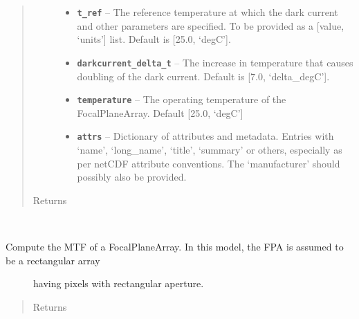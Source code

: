 \documentclass[a4paper,10pt,english]{sphinxmanual}
\begin{document}
\begin{fulllineitems}
\begin{fulllineitems}
\begin{quote}
\begin{description}
\begin{itemize}
\item {} 
\textbf{\texttt{t\_ref}} -- The reference temperature at which the dark current and other parameters are specified.
To be provided as a {[}value, `units'{]} list. Default is {[}25.0, `degC'{]}.

\item {} 
\textbf{\texttt{darkcurrent\_delta\_t}} -- The increase in temperature that causes doubling of the dark current.
Default is {[}7.0, `delta\_degC'{]}.

\item {} 
\textbf{\texttt{temperature}} -- The operating temperature of the FocalPlaneArray. Default {[}25.0, `degC'{]}

\item {} 
\textbf{\texttt{attrs}} -- Dictionary of attributes and metadata. Entries with `name', `long\_name', `title',
`summary' or others, especially as per netCDF attribute conventions.
The `manufacturer' should possibly also be provided.

\end{itemize}

\item[{Returns}] \leavevmode


\end{description}\end{quote}

\end{fulllineitems}


\begin{fulllineitems}
\label{packages:electro.FocalPlaneArray.compute_mtf}~\begin{description}
\item[{Compute the MTF of a FocalPlaneArray. In this model, the FPA is assumed to be a rectangular array}] \leavevmode
having pixels with rectangular aperture.

\end{description}
\begin{quote}\begin{description}
\item[{Returns}] \leavevmode


\end{description}\end{quote}

\end{fulllineitems}


\end{fulllineitems}
\end{document}
